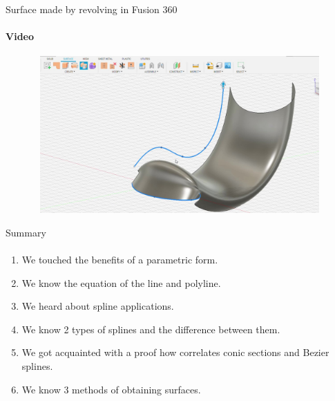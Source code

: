 \documentclass[aspectratio=169]{beamer}
\begin{document}
\begin{frame}[t]{Surface made by revolving in Fusion 360}
    \framesubtitle{Video}
    \vspace{-0.6cm}
    \begin{figure}[H]
        \href{run:./videos/sweep_surface_video.mp4}{
            \centering\includegraphics[height=6cm,width=1\textwidth,keepaspectratio]{sweep_surface_video_preview.jpg}}
    \end{figure}
\end{frame}
    


\begin{frame}[t]{Summary}
\framesubtitle{}
\begin{enumerate}
    \item We touched the benefits of a parametric form.
    \pause
    \item We know the equation of the line and polyline.
    \pause
    \item We heard about spline applications.
    \pause
    \item We know 2 types of splines and the difference between them.
    \pause
    \item We got acquainted with a proof how correlates conic sections and Bezier splines.
    \item We know 3 methods of obtaining surfaces.
\end{enumerate}

\end{frame}
\end{document}
